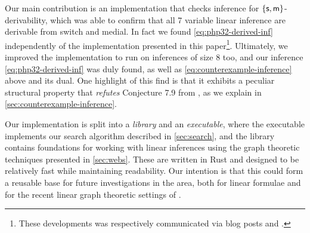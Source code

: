 \documentclass[a4paper, UKenglish, cleveref]{lipics-v2019}
\begin{document}
Our main contribution is an implementation that checks inference for \(\{\mathsf{s},\mathsf{m}\}\)-derivability, which was able to confirm that all 7 variable linear inference are derivable from switch and medial. In fact we found \eqref{eq:php32-derived-inf} independently of the implementation presented in this paper\footnote{These developments was respectively communicated via blog posts \cite{Ric20:lin-inf-size-7} and \cite{Das20:lin-inf-size-8}.}.
Ultimately, we improved the implementation to run on inferences of size 8 too,
and our inference \eqref{eq:php32-derived-inf} was duly found, as well as \eqref{eq:counterexample-inference} above and its dual.
One highlight of this find is that it exhibits a peculiar structural property that \emph{refutes} Conjecture 7.9 from \cite{DasStr16:no-compl-lin-sys}, as we explain in \cref{sec:counterexample-inference}.

Our implementation is split into a \emph{library} and an \emph{executable}, where the executable implements our search algorithm described in \cref{sec:search}, and the library contains foundations for working with linear inferences using the graph theoretic techniques presented in \cref{sec:webs}. These are written in Rust and designed to be relatively fast while maintaining readability.
Our intention is that this could form a reusable base for future investigations in the area, both for linear formulae and for the recent linear graph theoretic settings of \cite{NguSei18:coh-int-graphs,AccHorStr20:mll-graphs-short,AccHorStr20:mll-graphs-full,CalDasWar20:bgl}.

\end{document}
